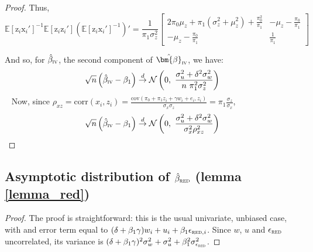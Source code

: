 \documentclass[usletter, 12pt]{article}
\begin{document}
\begin{proof}
		Thus, 
			\[
				     \mathbb{E}[\text{z}_{i}\text{x}_i']^{-1}\mathbb{E}[\text{z}_{i}\text{z}_i']  \left( \mathbb{E}[\text{z}_{i}\text{x}_i']^{-1} \right)' 
				     		= \dfrac{1}{\pi_1 \sigma_{z}^{2}} 
				     			\begin{bmatrix}
								2 \pi_0 \mu_z + \pi_1(\sigma_{z}^{2} + \mu_{z}^{2}) + \frac{\pi_0^2}{\pi_1}&   -\mu_{z} -  \frac{\pi_0}{\pi_1} \\ 
								  -\mu_{z} -  \frac{\pi_0}{\pi_1} & \frac{1}{\pi_1}
							\end{bmatrix} 
			\]
			
			And so, for $\hat{\beta}_{\textsc{iv}}$, the second component of $\hat{\bm{\beta}}_{\textsc{iv}}$, we have:
				\begin{equation}
					\sqrt{n}\left( \hat{\beta}_{\textsc{iv}} - \beta_{1} \right)
					\overset{d}{\to}
					\mathcal{N}\left( 0 , \ \dfrac{\sigma_{u}^{2} + \delta^{2}\sigma_{w}^{2}}{n \ \pi_{1}^{2}\sigma_{z}^{2}} \right) 
				\end{equation}
				~
				Now, since $ \rho_{xz} = \text{corr}(x_{i}, z_{i}) =  \frac{\text{cov}( \pi_0 + \pi_1 z_i + \gamma w_{i} + e_{i} , z_i)}{\sigma_x \sigma_z} = \pi_1 \frac{\sigma_z}{\sigma_x}$,
				~
				\[
						\sqrt{n}\left( \hat{\beta}_{\textsc{iv}} - \beta_{1} \right)
						\overset{d}{\to}
							 \mathcal{N}\left( 0 , \ \dfrac{\sigma_{u}^{2} + \delta^{2}\sigma_{w}^{2}}{\sigma_{x}^{2} \rho_{xz}^{2}} \right) 
				\]
			\end{proof}
				


\subsection{Asymptotic distribution of $\hat{\beta}_{\textsc{red}}$ (lemma \ref{lemma_red})}
				
			\begin{proof}
				The proof is straightforward: this is the usual univariate, unbiased case, with and error term equal to $(\delta + \beta_{1}\gamma) w_{i} + u_{i} + \beta_{1}\epsilon_{\textsc{red}, i}$. Since $w$, $u$ and $\epsilon_{\textsc{red}}$ uncorrelated, its variance is $(\delta + \beta_{1}\gamma)^{2} \sigma_{w}^{2} + \sigma_{u}^{2} + \beta_{1}^{2}\sigma_{\epsilon_{\textsc{red}}}^{2}$.
			\end{proof}
		
\end{document}
